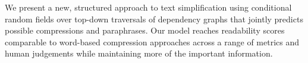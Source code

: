 We present a new, structured approach to text simplification using conditional random fields over top-down traversals of dependency graphs that jointly predicts possible compressions and paraphrases. Our model reaches readability scores comparable to word-based compression approaches across a range of metrics and human judgements while maintaining more of the important information.
